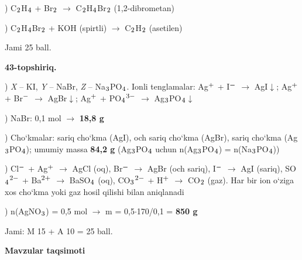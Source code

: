 \documentclass[11pt,a4paper]{article}
\renewcommand{\textsubscript}[1]{\ensuremath{_{\text{\fontsize{8}{8}\selectfont #1}}}}
\renewcommand{\textsuperscript}[1]{\ensuremath{^{\text{\fontsize{8}{8}\selectfont #1}}}}
\begin{document}
) C\textsubscript{2}H\textsubscript{4} + Br\textsubscript{2} $\to$ C\textsubscript{2}H\textsubscript{4}Br\textsubscript{2} (1,2-dibrometan)\par
{}) C\textsubscript{2}H\textsubscript{4}Br\textsubscript{2} + KOH (spirtli) $\to$ C\textsubscript{2}H\textsubscript{2} (asetilen)\par
\noindent Jami 25 ball.\par
\noindent\textbf{43-topshiriq.}\par
{}) \textit{X} -- KI, \textit{Y} -- NaBr, \textit{Z} -- Na\textsubscript{3}PO\textsubscript{4}. Ionli tenglamalar: Ag\textsuperscript{+} + I\textsuperscript{$-$} $\to$ AgI$\downarrow$; Ag\textsuperscript{+} + Br\textsuperscript{$-$} $\to$ AgBr$\downarrow$; Ag\textsuperscript{+} + PO\textsubscript{4}\textsuperscript{3$-$} $\to$ Ag\textsubscript{3}PO\textsubscript{4}$\downarrow$\par
{}) NaBr: 0,1 mol $\to$ \textbf{18,8 g}\par
{}) Cho`kmalar: sariq cho`kma (AgI), och sariq cho`kma (AgBr), sariq cho`kma (Ag\textsubscript{3}PO\textsubscript{4}); umumiy massa \textbf{84,2 g} (Ag\textsubscript{3}PO\textsubscript{4} uchun n(Ag\textsubscript{3}PO\textsubscript{4}) = n(Na\textsubscript{3}PO\textsubscript{4}))\par
{}) Cl\textsuperscript{$-$} + Ag\textsuperscript{+} $\to$ AgCl (oq), Br\textsuperscript{$-$} $\to$ AgBr (och sariq), I\textsuperscript{$-$} $\to$ AgI (sariq), SO\textsubscript{4}\textsuperscript{2$-$} + Ba\textsuperscript{2+} $\to$ BaSO\textsubscript{4} (oq), CO\textsubscript{3}\textsuperscript{2$-$} + H\textsuperscript{+} $\to$ CO\textsubscript{2} (gaz). Har bir ion o`ziga xos cho`kma yoki gaz hosil qilishi bilan aniqlanadi\par
{}) n(AgNO\textsubscript{3}) = 0,5 mol $\to$ m = 0,5$\cdot$170/0,1 = \textbf{850 g}\par
\noindent Jami: M 15 + A 10 = 25 ball.\par
\par\bigskip\noindent\textbf{Mavzular taqsimoti}\par\smallskip
\end{document}

